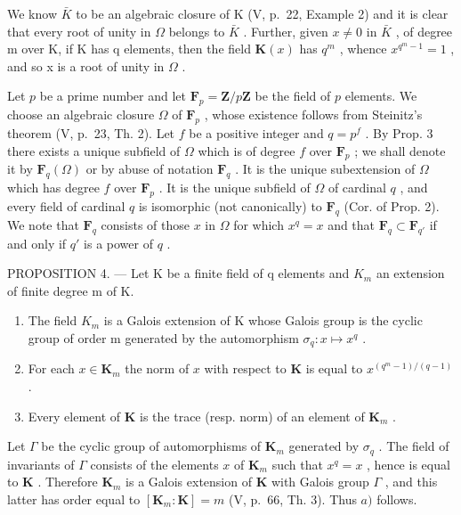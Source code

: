 We know \(\bar{K}\) to be an algebraic closure of K (V, p.~22, Example 2) and it is clear that every root of unity in \(\Omega\) belongs to \(\bar{K}\) . Further, given \(x \neq 0\) in \(\bar{K}\) , of degree m over K, if K has q elements, then the field \(\mathbf{K}(x)\) has \(q^{m}\) , whence \(x^{q^{m}-1} = 1\) , and so x is a root of unity in \(\Omega\) .

Let \(p\) be a prime number and let \(\mathbf{F}_p = \mathbf{Z} / p\mathbf{Z}\) be the field of \(p\) elements. We choose an algebraic closure \(\Omega\) of \(\mathbf{F}_p\) , whose existence follows from Steinitz's theorem (V, p.~23, Th. 2). Let \(f\) be a positive integer and \(q = p^f\) . By Prop. 3 there exists a unique subfield of \(\Omega\) which is of degree \(f\) over \(\mathbf{F}_p\) ; we shall denote it by \(\mathbf{F}_q(\Omega)\) or by abuse of notation \(\mathbf{F}_q\) . It is the unique subextension of \(\Omega\) which has degree \(f\) over \(\mathbf{F}_p\) . It is the unique subfield of \(\Omega\) of cardinal \(q\) , and every field of cardinal \(q\) is isomorphic (not canonically) to \(\mathbf{F}_q\) (Cor. of Prop. 2). We note that \(\mathbf{F}_q\) consists of those \(x\) in \(\Omega\) for which \(x^q = x\) and that \(\mathbf{F}_q \subset \mathbf{F}_{q'}\) if and only if \(q'\) is a power of \(q\) .

PROPOSITION 4. --- Let K be a finite field of q elements and \(K_{m}\) an extension of finite degree m of K.

\begin{enumerate}
\def\labelenumi{\alph{enumi})}
\item
  The field \(K_{m}\) is a Galois extension of K whose Galois group is the cyclic group of order m generated by the automorphism \(\sigma_{q}: x \mapsto x^{q}\) .
\item
  For each \(x \in \mathbf{K}_m\) the norm of \(x\) with respect to \(\mathbf{K}\) is equal to \(x^{(q^m - 1) / (q - 1)}\) .
\item
  Every element of \(\mathbf{K}\) is the trace (resp. norm) of an element of \(\mathbf{K}_m\) .
\end{enumerate}

Let \(\Gamma\) be the cyclic group of automorphisms of \(\mathbf{K}_m\) generated by \(\sigma_q\) . The field of invariants of \(\Gamma\) consists of the elements \(x\) of \(\mathbf{K}_m\) such that \(x^q = x\) , hence is equal to \(\mathbf{K}\) . Therefore \(\mathbf{K}_m\) is a Galois extension of \(\mathbf{K}\) with Galois group \(\Gamma\) , and this latter has order equal to \([\mathbf{K}_m: \mathbf{K}] = m\) (V, p.~66, Th. 3). Thus \(a)\) follows.

